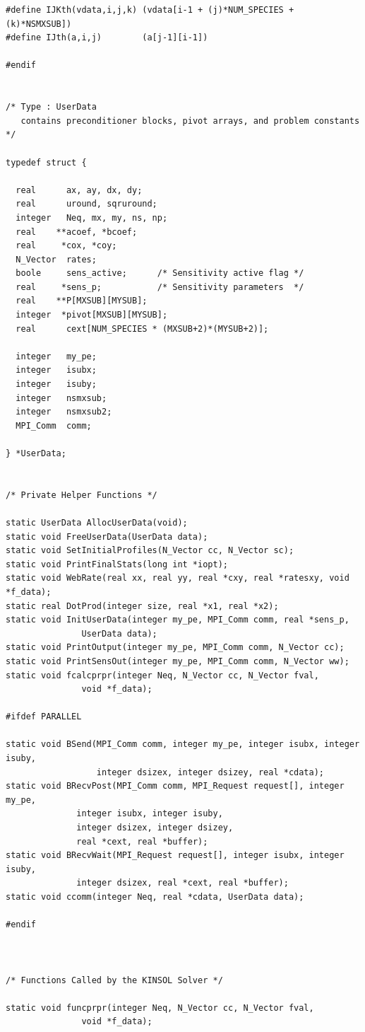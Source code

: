 \documentclass[11pt]{article}
\begin{document}
\begin{verbatim}
#define IJKth(vdata,i,j,k) (vdata[i-1 + (j)*NUM_SPECIES + (k)*NSMXSUB])
#define IJth(a,i,j)        (a[j-1][i-1])

#endif


/* Type : UserData
   contains preconditioner blocks, pivot arrays, and problem constants */

typedef struct {

  real      ax, ay, dx, dy;
  real      uround, sqruround;
  integer   Neq, mx, my, ns, np;
  real    **acoef, *bcoef;
  real     *cox, *coy;
  N_Vector  rates;
  boole     sens_active;      /* Sensitivity active flag */
  real     *sens_p;           /* Sensitivity parameters  */
  real    **P[MXSUB][MYSUB];
  integer  *pivot[MXSUB][MYSUB];
  real      cext[NUM_SPECIES * (MXSUB+2)*(MYSUB+2)];

  integer   my_pe;
  integer   isubx;
  integer   isuby;
  integer   nsmxsub;
  integer   nsmxsub2;
  MPI_Comm  comm;

} *UserData;


/* Private Helper Functions */

static UserData AllocUserData(void);
static void FreeUserData(UserData data);
static void SetInitialProfiles(N_Vector cc, N_Vector sc);
static void PrintFinalStats(long int *iopt);
static void WebRate(real xx, real yy, real *cxy, real *ratesxy, void *f_data);
static real DotProd(integer size, real *x1, real *x2);
static void InitUserData(integer my_pe, MPI_Comm comm, real *sens_p,
               UserData data);
static void PrintOutput(integer my_pe, MPI_Comm comm, N_Vector cc);
static void PrintSensOut(integer my_pe, MPI_Comm comm, N_Vector ww);
static void fcalcprpr(integer Neq, N_Vector cc, N_Vector fval,
               void *f_data);

#ifdef PARALLEL

static void BSend(MPI_Comm comm, integer my_pe, integer isubx, integer isuby,
                  integer dsizex, integer dsizey, real *cdata);
static void BRecvPost(MPI_Comm comm, MPI_Request request[], integer my_pe,
		      integer isubx, integer isuby,
		      integer dsizex, integer dsizey,
		      real *cext, real *buffer);
static void BRecvWait(MPI_Request request[], integer isubx, integer isuby,
		      integer dsizex, real *cext, real *buffer);
static void ccomm(integer Neq, real *cdata, UserData data);

#endif



/* Functions Called by the KINSOL Solver */

static void funcprpr(integer Neq, N_Vector cc, N_Vector fval,
               void *f_data);



\end{verbatim}
\end{document}
